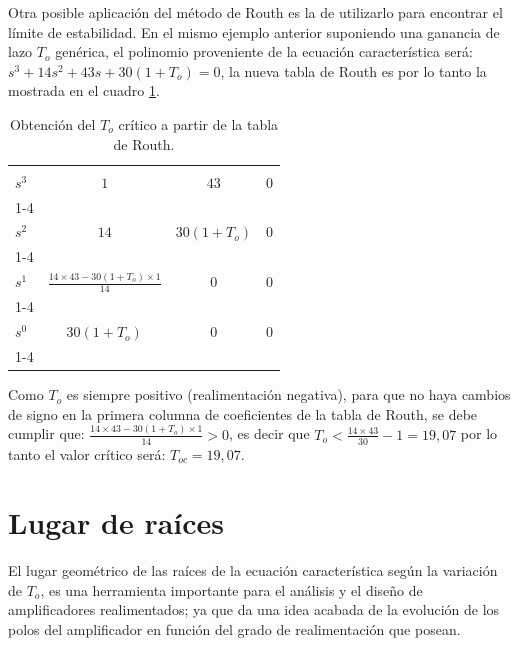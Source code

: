 Otra posible aplicación del método de Routh es la de utilizarlo para
encontrar el límite de estabilidad. En el mismo ejemplo anterior
suponiendo una ganancia de lazo $T_o$ genérica, el polinomio
proveniente de la ecuación característica será:
$s^3+14s^2+43s+30(1+T_o)=0$, la nueva tabla de Routh es por lo tanto
la mostrada en el cuadro \ref{tabla3}.

\begin{table}
	\centering
	\begin{tabular}{|l||c|c|c|}
		\hline
		&          &      &        \\
		$s^3$    & $1$         & $43$     & $0$     \\
		\cline{1-4}
		&          &      &     \\
		$s^2$  & $14$    & $30(1+T_o)$     & $0$     \\
		\cline{1-4}
		&          &      &        \\
		$s^1$ & $\frac{\displaystyle 14\times43-30(\displaystyle 1+T_o)\times1}{14}$         & $0$     & $0$     \\
		\cline{1-4}
		&          &      &        \\
		$s^0$      & $30(1+T_o)$         & $0$       & $0$ \\
		\cline{1-4}
		\hline
	\end{tabular}
	\caption{Obtención del $T_o$ crítico a partir de la tabla de Routh.}\label{tabla3}
\end{table}

Como $T_o$ es siempre positivo (realimentación negativa), para que
no haya cambios de signo en la primera columna de coeficientes de la
tabla de Routh, se debe cumplir que: $\frac{\displaystyle
	14\times43-30(1+T_o)\times1}{\displaystyle 14}>0$, es decir que
$T_o<\frac{\displaystyle 14\times43}{\displaystyle 30}-1=19,07$ por
lo tanto el valor crítico será: $T_{oc}=19,07$.

\section{Lugar de raíces}

\hspace{10pt} El lugar geométrico de las raíces de la ecuación característica
según la variación de $T_o$, es una  herramienta importante para el
análisis y el diseño de amplificadores realimentados; ya que da una
idea acabada de la evolución de los polos del amplificador en
función del grado de realimentación que posean.

